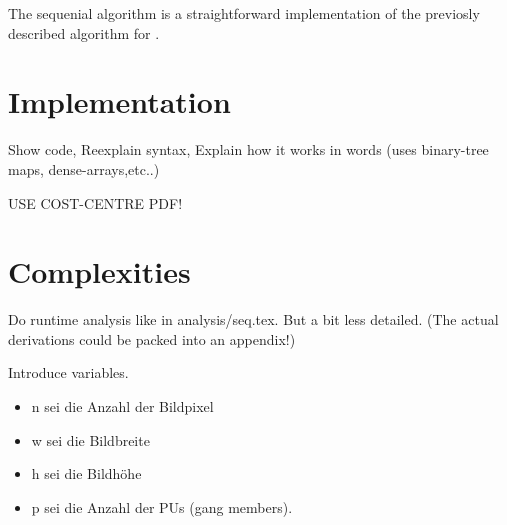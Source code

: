 


The sequenial algorithm is a straightforward implementation of the previosly
described algorithm for \algo.

\section{Implementation}
  Show code,
  Reexplain syntax,
  Explain how it works in words (uses binary-tree maps, dense-arrays,etc..)
  
  USE COST-CENTRE PDF!
  
\section{Complexities}
  Do runtime analysis like in analysis/seq.tex. But a bit less detailed.
  (The actual derivations could be packed into an appendix!)
  
  
  Introduce variables.
  \begin{itemize}
    \item n sei die Anzahl der Bildpixel
    \item w sei die Bildbreite
    \item h sei die Bildhöhe
    \item p sei die Anzahl der PUs (gang members).
  \end{itemize}
